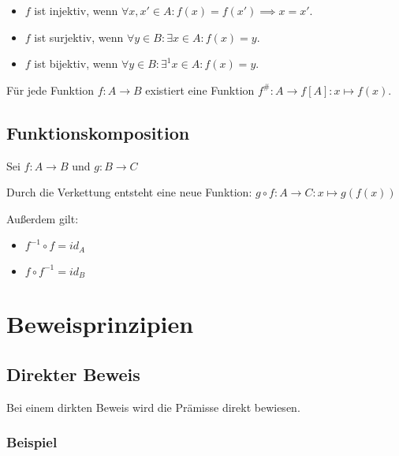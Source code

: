 \documentclass[12pt]{scrreprt}
\begin{document}
                \begin{itemize}
                    \item $ f $ ist injektiv, wenn $ \forall x, x' \in A : f(x) = f(x') \implies x = x' $.
                    \item $ f $ ist surjektiv, wenn $ \forall y \in B : \exists x \in A : f(x) = y $.
                    \item $ f $ ist bijektiv, wenn $ \forall y \in B : \exists ^ 1 x \in A : f(x) = y $.
                \end{itemize}

                Für jede Funktion $ f : A \rightarrow B $ existiert eine Funktion $ f ^ \# : A \rightarrow f[A] : x \mapsto f(x) $.


            \subsection{Funktionskomposition}
                \label{ss:grundbegriffe_funktionen_verkettung}

                Sei $ f : A \rightarrow B $ und $ g : B \rightarrow C $

                Durch die Verkettung entsteht eine neue Funktion: $ g \circ f : A \rightarrow C : x \mapsto g(f(x)) $

                Außerdem gilt:
                \begin{itemize}
                    \item $ f ^ { -1 } \circ f = id _ A $
                    \item $ f \circ f ^ { -1 } = id _ B $
                \end{itemize}


        \section{Beweisprinzipien}
            \label{s:grundbegriffe_beweise}

            \subsection{Direkter Beweis}
                \label{ss:grundbegriffe_beweise_direkt}

                Bei einem dirkten Beweis wird die Prämisse direkt bewiesen.

                \subsubsection{Beispiel}
\end{document}
